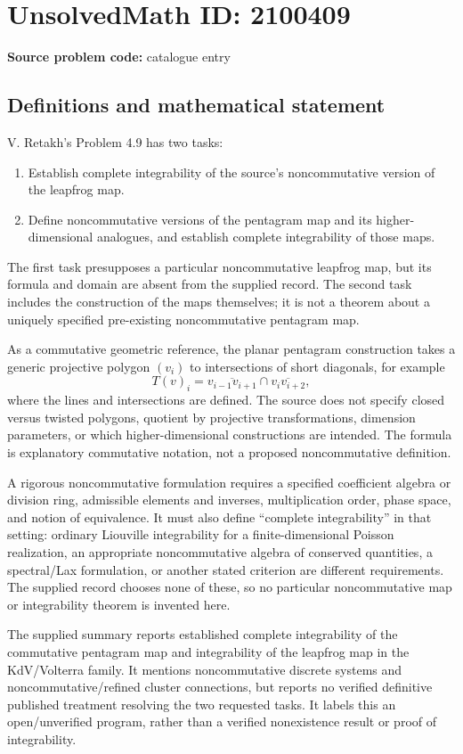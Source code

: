 \documentclass[11pt]{article}
\begin{document}
\section*{UnsolvedMath ID: 2100409}
\textbf{Source problem code:} catalogue entry
\subsection{Definitions and mathematical statement}
V. Retakh's Problem 4.9 has two tasks:
\begin{enumerate}
\item Establish complete integrability of the source's noncommutative version of the leapfrog map.
\item Define noncommutative versions of the pentagram map and its higher-dimensional analogues, and establish complete integrability of those maps.
\end{enumerate}
The first task presupposes a particular noncommutative leapfrog map, but its formula and domain are absent from the supplied record. The second task includes the construction of the maps themselves; it is not a theorem about a uniquely specified pre-existing noncommutative pentagram map.

As a commutative geometric reference, the planar pentagram construction takes a generic projective polygon $(v_i)$ to intersections of short diagonals, for example
\[
T(v)_i=\overline{v_{i-1}v_{i+1}}\cap\overline{v_iv_{i+2}},
\]
where the lines and intersections are defined. The source does not specify closed versus twisted polygons, quotient by projective transformations, dimension parameters, or which higher-dimensional constructions are intended. The formula is explanatory commutative notation, not a proposed noncommutative definition.

A rigorous noncommutative formulation requires a specified coefficient algebra or division ring, admissible elements and inverses, multiplication order, phase space, and notion of equivalence. It must also define ``complete integrability'' in that setting: ordinary Liouville integrability for a finite-dimensional Poisson realization, an appropriate noncommutative algebra of conserved quantities, a spectral/Lax formulation, or another stated criterion are different requirements. The supplied record chooses none of these, so no particular noncommutative map or integrability theorem is invented here.

The supplied summary reports established complete integrability of the commutative pentagram map and integrability of the leapfrog map in the KdV/Volterra family. It mentions noncommutative discrete systems and noncommutative/refined cluster connections, but reports no verified definitive published treatment resolving the two requested tasks. It labels this an open/unverified program, rather than a verified nonexistence result or proof of integrability.
\end{document}
